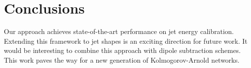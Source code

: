\section{Conclusions}\label{sec:conclusions}

Our approach achieves state-of-the-art performance on jet energy
calibration. Extending this framework to jet shapes is an exciting
direction for future work. It would be interesting to combine this
approach with dipole subtraction schemes. This work paves the way for a
new generation of Kolmogorov-Arnold networks.

